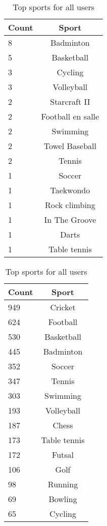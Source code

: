 \begin{table}[h]
\begin{minipage}[b]{.50\textwidth}
\centering
  \begin{tabular}{|l|c|} %
  \hline
  		\textbf{Count} & \textbf{Sport} \\ \hline
		8 & Badminton \\ \hline
		5 & Basketball \\ \hline
		3 & Cycling \\ \hline
		3 & Volleyball \\ \hline
		2 & Starcraft II \\ \hline
		2 & Football en salle \\ \hline
		2 & Swimming \\ \hline
		2 & Towel Baseball \\ \hline
		2 & Tennis \\ \hline
		1 & Soccer \\ \hline
		1 & Taekwondo \\ \hline
		1 & Rock climbing \\ \hline
		1 & In The Groove \\ \hline
		1 & Darts \\ \hline
		1 & Table tennis \\ \hline
  \end{tabular}
  \caption{Top sports for app users}
\end{minipage}
\begin{minipage}[b]{.50\textwidth}
\centering
  \begin{tabular}{|l|c|} %
  \hline
  		\textbf{Count} & \textbf{Sport} \\ \hline
  		949 & Cricket \\ \hline
		624 & Football \\ \hline
		530 & Basketball \\ \hline
		445 & Badminton \\ \hline
		352 & Soccer \\ \hline
		347 & Tennis \\ \hline
		303 & Swimming \\ \hline
		193 & Volleyball \\ \hline
		187 & Chess \\ \hline
		173 & Table tennis \\ \hline
		172 & Futsal \\ \hline
		106 & Golf \\ \hline
		98 & Running \\ \hline
		69 & Bowling \\ \hline
		65 & Cycling \\ \hline
  \end{tabular}
  \caption{Top sports for all users}
\end{minipage}


\end{table}
